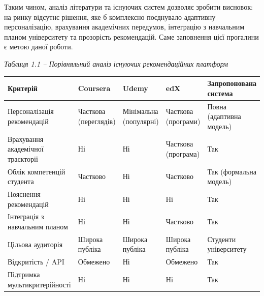 \documentclass[
]{article}
\newcounter{none} %
\begin{document}
Таким чином, аналіз літератури та існуючих систем дозволяє зробити
висновок: на ринку відсутнє рішення, яке б комплексно поєднувало
адаптивну персоналізацію, врахування академічних передумов, інтеграцію з
навчальним планом університету та прозорість рекомендацій. Саме
заповнення цієї прогалини є метою даної роботи.

\emph{Таблиця 1.1 -- Порівняльний аналіз існуючих рекомендаційних
платформ}

{\def\LTcaptype{none} %
\begin{longtable}[]{@{}
  >{\raggedright\arraybackslash}p{}
  >{\centering\arraybackslash}p{}
  >{\centering\arraybackslash}p{}
  >{\centering\arraybackslash}p{}
  >{\centering\arraybackslash}p{}@{}}
\toprule\noalign{}
\begin{minipage}[b]{\linewidth}\centering
\textbf{Критерій}
\end{minipage} & \begin{minipage}[b]{\linewidth}\centering
\textbf{Coursera}
\end{minipage} & \begin{minipage}[b]{\linewidth}\centering
\textbf{Udemy}
\end{minipage} & \begin{minipage}[b]{\linewidth}\centering
\textbf{edX}
\end{minipage} & \begin{minipage}[b]{\linewidth}\centering
\textbf{Запропонована система}
\end{minipage} \\
\midrule\noalign{}
\endhead
\bottomrule\noalign{}
\endlastfoot
Персоналізація рекомендацій & Часткова (переглядів) & Мінімальна
(популярні) & Часткова (програми) & Повна (адаптивна модель) \\
Врахування академічної траєкторії & Ні & Ні & Часткова (програма) &
Так \\
Облік компетенцій студента & Частково & Ні & Частково & Так (формальна
модель) \\
Пояснення рекомендацій & Ні & Ні & Ні & Так \\
Інтеграція з навчальним планом & Ні & Ні & Частково & Так \\
Цільова аудиторія & Широка публіка & Широка публіка & Широка публіка &
Студенти університету \\
Відкритість / API & Обмежено & Ні & Обмежено & Так \\
Підтримка мультикритерійності & Ні & Ні & Ні & Так \\
\end{longtable}
}
\end{document}

